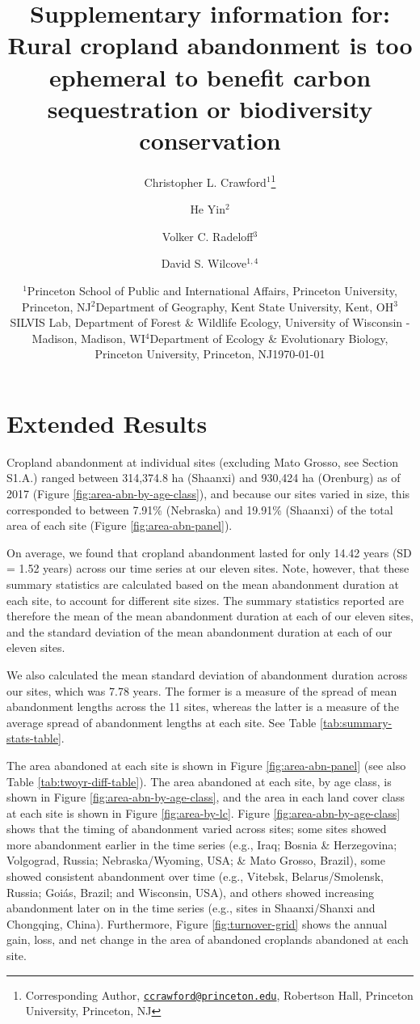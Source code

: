 \documentclass[
]{article}
\title{Supplementary information for: Rural cropland abandonment is too ephemeral to benefit carbon sequestration or biodiversity conservation}
\author{Christopher L. Crawford\(^1\)\footnote{Corresponding Author, \href{mailto:ccrawford@princeton.edu}{\nolinkurl{ccrawford@princeton.edu}}, Robertson Hall, Princeton University, Princeton, NJ} \and He Yin\(^2\) \and Volker C. Radeloff\(^3\) \and David S. Wilcove\(^{1,4}\)}
\date{\(^1\)Princeton School of Public and International Affairs, Princeton University, Princeton, NJ\newline \(^2\)Department of Geography, Kent State University, Kent, OH\newline \(^3\)SILVIS Lab, Department of Forest \& Wildlife Ecology, University of Wisconsin - Madison, Madison, WI\newline \(^4\)Department of Ecology \& Evolutionary Biology, Princeton University, Princeton, NJ\newline \newline \today}
\newcommand{\beginsupplement}{
	\setcounter{figure}{0} 
	\setcounter{section}{0} 
	\setcounter{table}{0} 
	\setcounter{equation}{0} 

	\renewcommand{\thefigure}{S\arabic{figure}} 
	\renewcommand{\thesection}{S\arabic{section}} 
	\renewcommand{\thetable}{S\arabic{table}} 
	\renewcommand\theequation{S\arabic{equation}}
	}
\begin{document}
\maketitle

{
\hypersetup{linkcolor=}
\setcounter{tocdepth}{2}
\tableofcontents
}
\beginsupplement

\listoftables
\listoffigures

\newpage

\hypertarget{results-si}{%
\section{Extended Results}\label{results-si}}

Cropland abandonment at individual sites (excluding Mato Grosso, see Section S1.A.) ranged between 314,374.8 ha (Shaanxi) and 930,424 ha (Orenburg) as of 2017 (Figure \ref{fig:area-abn-by-age-class}), and because our sites varied in size, this corresponded to between 7.91\% (Nebraska) and 19.91\% (Shaanxi) of the total area of each site (Figure \ref{fig:area-abn-panel}).

On average, we found that cropland abandonment lasted for only 14.42 years (SD = 1.52 years) across our time series at our eleven sites.
Note, however, that these summary statistics are calculated based on the mean abandonment duration at each site, to account for different site sizes.
The summary statistics reported are therefore the mean of the mean abandonment duration at each of our eleven sites, and the standard deviation of the mean abandonment duration at each of our eleven sites.

We also calculated the mean standard deviation of abandonment duration across our sites, which was 7.78 years.
The former is a measure of the spread of mean abandonment lengths across the 11 sites, whereas the latter is a measure of the average spread of abandonment lengths at each site.
See Table \ref{tab:summary-stats-table}.

The area abandoned at each site is shown in Figure \ref{fig:area-abn-panel} (see also Table \ref{tab:twoyr-diff-table}).
The area abandoned at each site, by age class, is shown in Figure \ref{fig:area-abn-by-age-class}, and the area in each land cover class at each site is shown in Figure \ref{fig:area-by-lc}.
Figure \ref{fig:area-abn-by-age-class} shows that the timing of abandonment varied across sites; some sites showed more abandonment earlier in the time series (e.g., Iraq; Bosnia \& Herzegovina; Volgograd, Russia; Nebraska/Wyoming, USA; \& Mato Grosso, Brazil), some showed consistent abandonment over time (e.g., Vitebsk, Belarus/Smolensk, Russia; Goiás, Brazil; and Wisconsin, USA), and others showed increasing abandonment later on in the time series (e.g., sites in Shaanxi/Shanxi and Chongqing, China).
Furthermore, Figure \ref{fig:turnover-grid} shows the annual gain, loss, and net change in the area of abandoned croplands abandoned at each site.
\end{document}
